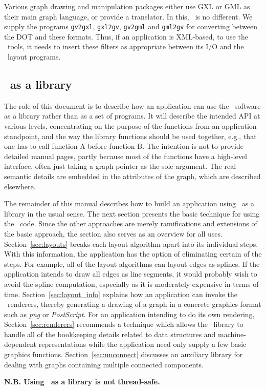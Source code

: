 Various graph drawing and manipulation packages either 
use GXL or GML as their main graph language, or provide a translator.  
In this, \gviz\ is no different. We supply the programs
{\tt gv2gxl}, {\tt gxl2gv}, {\tt gv2gml} and {\tt gml2gv} 
for converting between the DOT and
these formats. Thus, if an application is XML-based, to use the
\gviz\ tools, it needs to insert these filters as appropriate between
its I/O and the \gviz\ layout programs.  

\subsection{\gviz\ as a library}
The role of this document is to describe how an application can use the
\gviz\ software as a library rather than as a set of programs. It will
describe the intended API at various levels, concentrating on the purpose
of the functions from an application standpoint, and the way the 
library functions should be used together, e.g., that one has to call
function A before function B. The intention is not to provide
detailed manual pages, partly because most of the functions have a high-level 
interface, often just taking a graph pointer as the sole argument.
The real semantic details are embedded in the
attributes of the graph, which are described elsewhere. 

The remainder of this manual describes how to build an application
using \gviz\ as a library in the usual sense.
The next section presents the basic technique for using the \gviz\ code. Since
the other approaches are merely ramifications and extensions of the
basic approach, the section also serves as an overview for all uses.
Section~\ref{sec:layouts} breaks each layout algorithm apart into 
its individual steps.
With this information, the application has the option of eliminating
certain of the steps. For example, all of the layout algorithms can 
layout edges as splines. If the application intends to draw all edges
as line segments, it would probably wish to avoid the spline computation,
especially as it is moderately expensive in terms of time. 
Section~\ref{sec:layout_info} explains how an application can invoke the
\gviz\ renderers, thereby generating a drawing of a graph in 
a concrete graphics format such as {\em png} or {\em PostScript}.
For an application intending to do its own rendering,
Section~\ref{sec:renderers} recommends a technique which allows the
\gviz\ library to handle all of the bookkeeping details related to
data structures and machine-dependent representations while the
application need only supply a few basic graphics functions.
Section~\ref{sec:unconnect}
discusses an auxiliary library for dealing with graphs containing
multiple connected components.

{\bf N.B. Using \gviz\ as a library is not thread-safe.}
